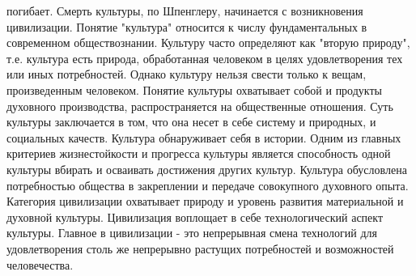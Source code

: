 \documentclass[12pt]{article}
\begin{document}
погибает. Смерть культуры, по Шпенглеру, начинается с возникновения цивилизации.
Понятие  "культура"  относится  к  числу  фундаментальных  в  современном  обществознании.  Культуру  часто
определяют как "вторую природу", т.е. культура есть природа, обработанная человеком в целях удовлетворения
тех  или  иных  потребностей.  Однако  культуру  нельзя  свести  только  к  вещам,  произведенным  человеком.
Понятие культуры охватывает собой и продукты духовного производства, распространяется на общественные
отношения. Суть культуры заключается в том, что она несет в себе систему и природных, и социальных качеств.
Культура обнаруживает себя в истории. Одним из главных критериев жизнестойкости и прогресса культуры
является способность одной культуры вбирать и осваивать достижения других культур. Культура обусловлена
потребностью общества в закреплении и передаче совокупного духовного опыта.
Категория  цивилизации  охватывает  природу  и  уровень  развития  материальной  и  духовной  культуры.
Цивилизация воплощает в себе технологический аспект культуры. Главное в цивилизации - это непрерывная
смена  технологий  для  удовлетворения  столь  же  непрерывно  растущих  потребностей  и  возможностей
человечества.

\newpage
\end{document}
